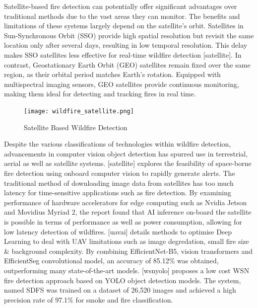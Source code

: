 \label{sn}{}

Satellite-based fire detection can potentially offer significant
advantages over traditional methods due to the vast areas they can
monitor. The benefits and limitations of these systems largely depend on
the satellite's orbit. Satellites in Sun-Synchronous Orbit (SSO) provide
high spatial resolution but revisit the same location only after several
days, resulting in low temporal resolution. This delay makes SSO
satellites less effective for real-time wildfire detection
{[}satellite{]}. In contrast, Geostationary Earth Orbit (GEO) satellites
remain fixed over the same region, as their orbital period matches
Earth's rotation. Equipped with multispectral imaging sensors, GEO
satellites provide continuous monitoring, making them ideal for
detecting and tracking fires in real time.

\begin{figure}
\centering
\texttt{[image: wildfire\_satellite.png]}
\caption{Satellite Based Wildfire Detection}
\end{figure}

\label{sn}{}

Despite the various classifications of technologies within wildfire
detection, advancements in computer vision object detection has spurred
use in terrestrial, aerial as well as satellite systems. {[}satellite{]}
explores the feasibility of space-borne fire detection using onboard
computer vision to rapidly generate alerts. The traditional method of
downloading image data from satellites has too much latency for
time-sensitive applications such as fire detection. By examining
performance of hardware accelerators for edge computing such as Nvidia
Jetson and Movidius Myriad 2, the report found that AI inference
on-board the satellite is possible in terms of performance as well as
power consumption, allowing for low latency detection of wildfires.
{[}uavai{]} details methods to optimise Deep Learning to deal with UAV
limitations such as image degredation, small fire size \& background
complexity. By combining EfficientNet-B5, vision transformers and
EfficientSeg convolutional model, an accuracy of 85.12\% was obtained,
outperforming many state-of-the-art models. {[}wsnyolo{]} proposes a low
cost WSN fire detection approach based on YOLO object detection models.
The system, named SDFS was trained on a dataset of 26,520 images and
achieved a high precision rate of 97.1\% for smoke and fire
classification.

